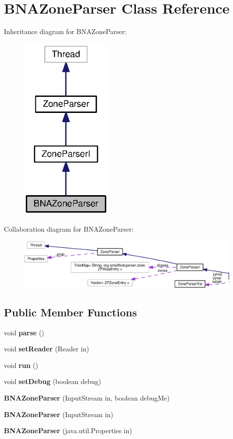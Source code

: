 \section{B\+N\+A\+Zone\+Parser Class Reference}
\label{classorg_1_1smallfoot_1_1parser_1_1zone_1_1BNAZoneParser}


Inheritance diagram for B\+N\+A\+Zone\+Parser\+:\nopagebreak
\begin{figure}[H]
\begin{center}
\leavevmode
\includegraphics[width=132pt]{classorg_1_1smallfoot_1_1parser_1_1zone_1_1BNAZoneParser__inherit__graph}
\end{center}
\end{figure}


Collaboration diagram for B\+N\+A\+Zone\+Parser\+:
\nopagebreak
\begin{figure}[H]
\begin{center}
\leavevmode
\includegraphics[width=350pt]{classorg_1_1smallfoot_1_1parser_1_1zone_1_1BNAZoneParser__coll__graph}
\end{center}
\end{figure}
\subsection*{Public Member Functions}
\begin{DoxyCompactItemize}
\item 
void {\bf parse} ()
\item 
void {\bf set\+Reader} (Reader in)
\item 
void {\bf run} ()
\item 
void {\bf set\+Debug} (boolean debug)
\item 
{\bf B\+N\+A\+Zone\+Parser} (Input\+Stream in, boolean debug\+Me)
\item 
{\bf B\+N\+A\+Zone\+Parser} (Input\+Stream in)
\item 
{\bf B\+N\+A\+Zone\+Parser} (java.\+util.\+Properties in)
\end{DoxyCompactItemize}
